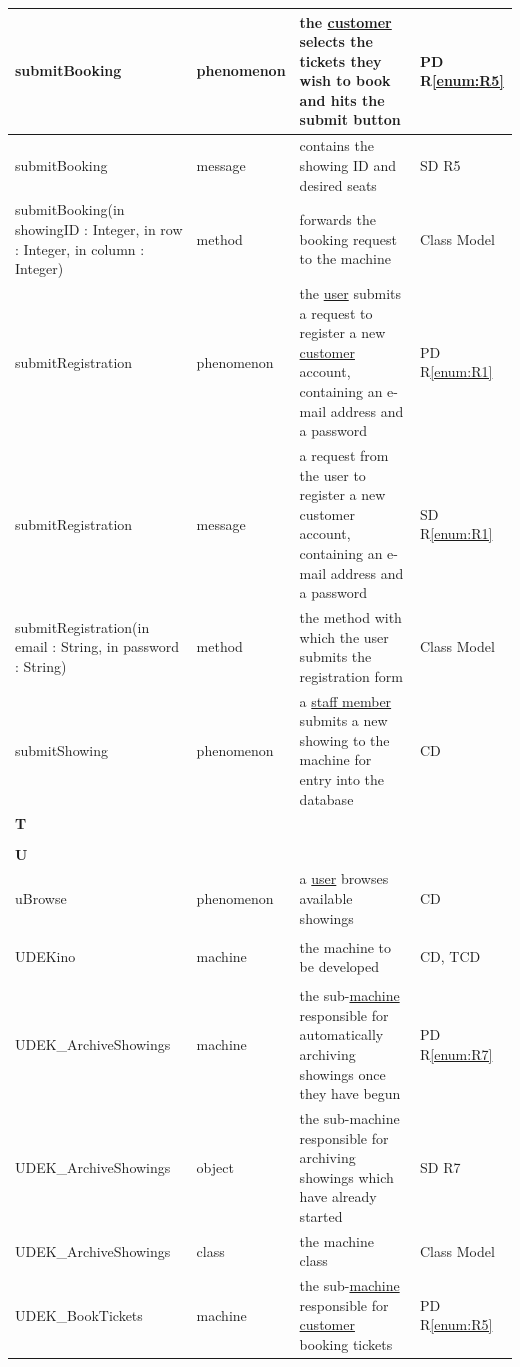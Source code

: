\documentclass[a4paper,10pt,titlepage,bibtotoc,bibtotocnumbered]{scrreprt}
\begin{document}
\begin{longtable}{|p{4cm}|p{3cm}|p{5cm}|l|}
\hline
\hypertarget{glossary:submitBooking}{submitBooking} & phenomenon & the \hyperlink{glossary:Customer}{customer} selects the tickets they wish to book and hits the submit button &  PD R\ref{enum:R5}\\
\hline
submitBooking & message & contains the showing ID and desired seats & SD R5\\
\hline
submitBooking(in showingID : Integer, in row : Integer, in column : Integer) & method & forwards the booking request to the machine & Class Model\\
\hline
\hypertarget{glossary:submitRegistration}{submitRegistration} & phenomenon & the \hyperlink{glossary:User}{user} submits a request to register a new \hyperlink{glossary:Customer}{customer} account, containing an e-mail address and a password & PD R\ref{enum:R1}\\
\hline
submitRegistration & message & a request from the user to register a new customer account, containing an e-mail address and a password & SD R\ref{enum:R1}\\
\hline
submitRegistration(in email : String, in password : String) & method & the method with which the user submits the registration form & Class Model\\
\hline
\hypertarget{glossary:submitShowing}{submitShowing} & phenomenon & a \hyperlink{glossary:StaffMember}{staff member} submits a new showing to the machine for entry into the database & CD\\
\hline
\multicolumn{4}{|l|}{\textbf{T}}\\
\hline
&  &  & \\
\hline
\multicolumn{4}{|l|}{\textbf{U}}\\
\hline
\hypertarget{glossary:uBrowse}{uBrowse} & phenomenon & a \hyperlink{glossary:User}{user} browses available showings & CD\\
\hline
\hypertarget{glossary:UDEKino}{UDEKino} & machine & the machine to be developed & CD, TCD\\
\hline
\hypertarget{glossary:UDEK-ArchiveShowings}{UDEK\_ArchiveShowings} & machine & the sub-\hyperlink{glossary:UDEKino}{machine} responsible for automatically archiving showings once they have begun & PD R\ref{enum:R7} \\
\hline
UDEK\_ArchiveShowings & object & the sub-machine responsible for archiving showings which have already started & SD R7\\
\hline
UDEK\_ArchiveShowings & class & the machine class & Class Model\\
\hline
\hypertarget{glossary:UDEK-BookTickets}{UDEK\_BookTickets} & machine & the sub-\hyperlink{glossary:UDEKino}{machine} responsible for \hyperlink{glossary:Customer}{customer} booking tickets & PD R\ref{enum:R5}\\

\end{longtable}
\end{document}

